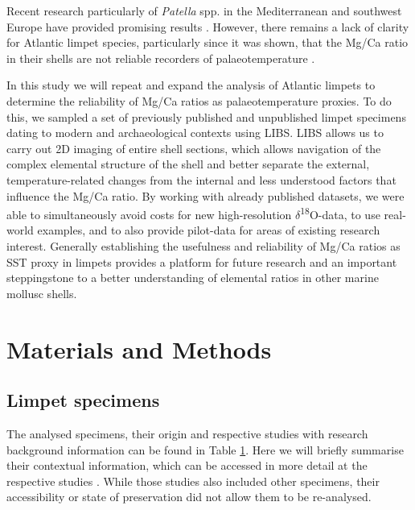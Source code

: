 \documentclass[
  authoryear,
  preprint,
  3p]{elsarticle}
\begin{document}
Recent research particularly of \emph{Patella} spp. in the Mediterranean
and southwest Europe have provided promising results
\citep{Hausmann2019-fi, Garcia-Escarzaga2015-jc, Garcia-Escarzaga2018-nf}.
However, there remains a lack of clarity for Atlantic limpet species,
particularly since it was shown, that the Mg/Ca ratio in their shells
are not reliable recorders of palaeotemperature \citep{Graniero2017-io}.

In this study we will repeat and expand the analysis of Atlantic limpets
to determine the reliability of Mg/Ca ratios as palaeotemperature
proxies. To do this, we sampled a set of previously published and
unpublished limpet specimens dating to modern and archaeological
contexts using LIBS. LIBS allows us to carry out 2D imaging of entire
shell sections, which allows navigation of the complex elemental
structure of the shell and better separate the external,
temperature-related changes from the internal and less understood
factors that influence the Mg/Ca ratio. By working with already
published datasets, we were able to simultaneously avoid costs for new
high-resolution \(\delta\)\textsuperscript{18}O-data, to use real-world
examples, and to also provide pilot-data for areas of existing research
interest. Generally establishing the usefulness and reliability of Mg/Ca
ratios as SST proxy in limpets provides a platform for future research
and an important steppingstone to a better understanding of elemental
ratios in other marine mollusc shells.

\section{Materials and Methods}\label{Methods}

\subsection{Limpet specimens}\label{limpet-specimens}

The analysed specimens, their origin and respective studies with
research background information can be found in Table
\hyperref[Table_1]{1}. Here we will briefly summarise their contextual
information, which can be accessed in more detail at the respective
studies \citep{Nicastro2020-ih, Surge2012-ba, Graniero2017-io}. While
those studies also included other specimens, their accessibility or
state of preservation did not allow them to be re-analysed.

\label{Table_1}
\fontsize{8pt}{8pt}\selectfont
\end{document}
